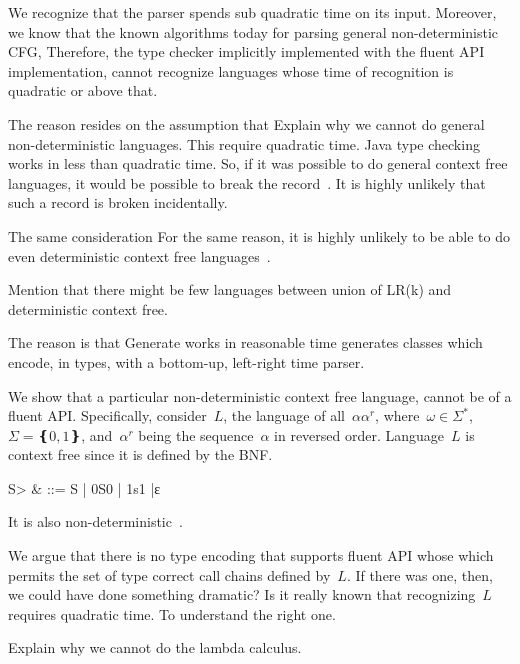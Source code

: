 We recognize that the \Java parser spends sub quadratic time
  on its input.
Moreover, we know that the known algorithms today for parsing general 
  non-deterministic CFG,
Therefore,
  the type checker implicitly implemented with the fluent API implementation,
  cannot recognize languages whose time of recognition is quadratic or above that.

The reason resides on the assumption that
Explain why we cannot do general non-deterministic languages. This require quadratic time.
Java type checking works in less than quadratic time. So, if it was possible to
do general context free languages, it would be possible to
  break the record~\cite{cubic time algorithms}.
It is highly unlikely that such a record is broken incidentally.

The same consideration
For the same reason, it is highly unlikely to be able to do even deterministic
context free languages~\cite{http://www.sciencedirect.com/science/article/pii/S0019995868910875}.

   Mention that there might be few languages between union of LR(k) and deterministic context free.

The reason is that Generate works in reasonable time \Self generates classes which encode, in types, with a bottom-up, left-right time parser.

We show that a particular non-deterministic context free language,
cannot be of a fluent API\@.
Specifically, consider~$L$, the language of all~$αα^r$, where~$\omega∈Σ^*$,~$Σ=❴0,1❵$,
and~$α^r$ being the sequence~$α$ in reversed order.
Language~$L$ is context free since it is defined by the BNF.
\begin{Grammar}
  \begin{aligned}
    \<S> & ::= S | 0S0 | 1s1 |ε
  \end{aligned}
\end{Grammar}
It is also non-deterministic~\cite{Hopcroft:2001}.

We argue that there is no type encoding that supports fluent API whose
  which permits the set of type correct call chains defined by~$L$.
If there was one, then, we could have done something dramatic?
Is it really known that recognizing~$L$ requires quadratic
  time.
To understand
 the right one.

Explain why we cannot do the lambda calculus.

